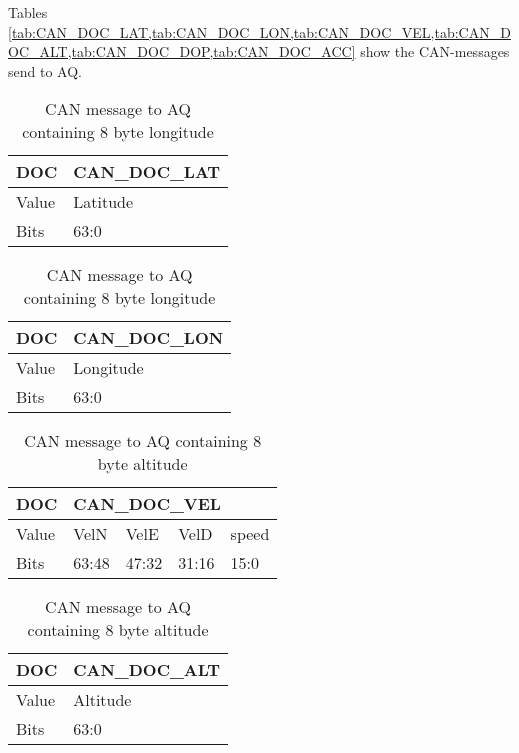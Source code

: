 Tables \cref{tab:CAN_DOC_LAT,tab:CAN_DOC_LON,tab:CAN_DOC_VEL,tab:CAN_DOC_ALT,tab:CAN_DOC_DOP,tab:CAN_DOC_ACC} show the CAN-messages send to \ac{AQ}.
\begin{multicols}{2}
\begin{table}[H]
	\begin{tabular}{@{}|l|l|@{}}
		\toprule
		DOC   & CAN\_DOC\_LAT \\ \midrule
		Value & Latitude      \\ \midrule
		Bits  & 63:0          \\ \bottomrule
	\end{tabular}
	\caption{CAN message to \ac{AQ} containing 8 byte latitude}	\label{tab:CAN_DOC_LAT}

	\begin{tabular}{@{}|l|l|@{}}
	\toprule
		DOC   & CAN\_DOC\_LON \\ \midrule
		Value & Longitude     \\ \midrule
		Bits  & 63:0          \\ \bottomrule
	\end{tabular}
	\caption{CAN message to \ac{AQ} containing 8 byte longitude} 	\label{tab:CAN_DOC_LON}

\end{table}
\columnbreak
\begin{table}[H]
	\begin{tabular}{@{}|l|l|l|l|l|@{}}
		\toprule
		DOC   & \multicolumn{4}{l|}{CAN\_DOC\_VEL} \\ \midrule
		Value & VelN    & VelE   & VelD   & speed  \\ \midrule
		Bits  & 63:48   & 47:32  & 31:16  & 15:0   \\ \bottomrule
	\end{tabular}
	\caption{CAN message to \ac{AQ} containing velocities each of 2 bytes}
	\label{tab:CAN_DOC_VEL}
	\begin{tabular}{@{}|l|l|@{}}
	\toprule
		DOC   & CAN\_DOC\_ALT \\ \midrule
		Value & Altitude      \\ \midrule
		Bits  & 63:0          \\ \bottomrule
	\end{tabular}
	\caption{CAN message to \ac{AQ} containing 8 byte altitude}
	\label{tab:CAN_DOC_ALT}
\end{table}
\end{multicols}

